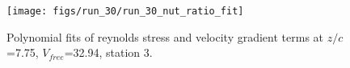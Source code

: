 \begin{figure}[H]
\centering
\texttt{[image: figs/run\_30/run\_30\_nut\_ratio\_fit]}
\caption{Polynomial fits of reynolds stress and velocity gradient terms at $z/c$=7.75, $V_{free}$=32.94, station 3.}
\label{fig:run_30_nut_ratio_fit}
\end{figure}


